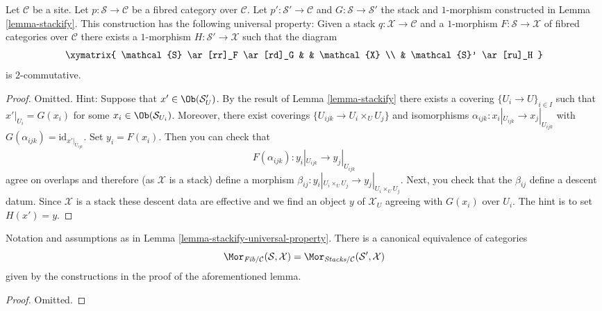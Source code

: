 \begin{lemma}
\label{lemma-stackify-universal-property}
Let $\mathcal{C}$ be a site.
Let $p : \mathcal{S} \to \mathcal{C}$ be a fibred category over $\mathcal{C}$.
Let $p' : \mathcal{S}' \to \mathcal{C}$ and $G : \mathcal{S} \to \mathcal{S}'$
the stack and $1$-morphism constructed in Lemma \ref{lemma-stackify}.
This construction has the following universal property: Given a stack
$q : \mathcal{X} \to \mathcal{C}$ and a $1$-morphism
$F : \mathcal{S} \to \mathcal{X}$ of fibred categories over $\mathcal{C}$
there exists a $1$-morphism $H : \mathcal{S}' \to \mathcal{X}$
such that the diagram
$$
\xymatrix{
\mathcal{S} \ar[rr]_F \ar[rd]_G & & \mathcal{X} \\
& \mathcal{S}' \ar[ru]_H
}
$$
is $2$-commutative.
\end{lemma}

\begin{proof}
Omitted. Hint: Suppose that $x' \in \Ob(\mathcal{S}'_U)$.
By the result of Lemma \ref{lemma-stackify}
there exists a covering $\{U_i \to U\}_{i \in I}$
such that $x'|_{U_i} = G(x_i)$ for some $x_i \in \Ob(\mathcal{S}_{U_i})$.
Moreover, there exist coverings $\{U_{ijk} \to U_i \times_U U_j\}$
and isomorphisms $\alpha_{ijk} : x_i|_{U_{ijk}} \to x_j|_{U_{ijk}}$
with $G(\alpha_{ijk}) = \text{id}_{x'|_{U_{ijk}}}$. Set $y_i = F(x_i)$.
Then you can check that
$$
F(\alpha_{ijk}) : y_i|_{U_{ijk}} \to y_j|_{U_{ijk}}
$$
agree on overlaps and therefore (as $\mathcal{X}$ is a stack) define
a morphism $\beta_{ij} : y_i|_{U_i \times_U U_j} \to y_j|_{U_i \times_U U_j}$.
Next, you check that the $\beta_{ij}$ define a descent datum. Since
$\mathcal{X}$ is a stack these descent data are effective and we find
an object $y$ of $\mathcal{X}_U$ agreeing with $G(x_i)$ over $U_i$.
The hint is to set $H(x') = y$.
\end{proof}

\begin{lemma}
\label{lemma-stackify-universal-property-more}
Notation and assumptions as in
Lemma \ref{lemma-stackify-universal-property}.
There is a canonical equivalence of categories
$$
\Mor_{\textit{Fib}/\mathcal{C}}(\mathcal{S}, \mathcal{X})
=
\Mor_{\textit{Stacks}/\mathcal{C}}(\mathcal{S}', \mathcal{X})
$$
given by the constructions in the proof of the aforementioned lemma.
\end{lemma}

\begin{proof}
Omitted.
\end{proof}

